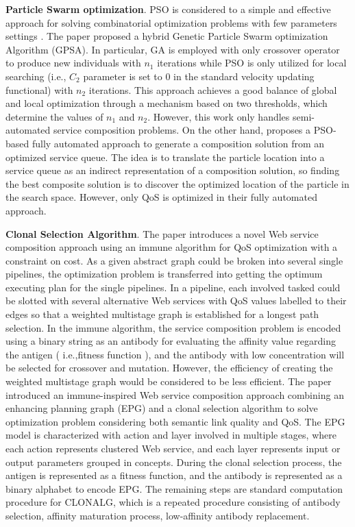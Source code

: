 \textbf{Particle Swarm optimization}.
PSO is considered to a simple and effective approach for solving combinatorial optimization problems with few parameters settings \cite{long2009environment}. The paper \cite{liu2007hybrid} proposed a hybrid Genetic Particle Swarm optimization Algorithm (GPSA). In particular, GA is employed with only crossover operator to produce new individuals with $n_1$ iterations while PSO is only utilized for local searching (i.e., $C_2$ parameter is set to 0 in the standard velocity updating functional) with $n_2$ iterations. This approach achieves a good balance of global and local optimization through a  mechanism based on two thresholds, which determine the values of $n_1$ and $n_2$. However, this work \cite{liu2007hybrid} only handles semi-automated service composition problems. On the other hand, \cite{da2016particle} proposes a PSO-based fully automated approach to generate a composition solution from an optimized service queue. The idea is to translate the particle location into a service queue as an indirect representation of a composition solution, so finding the best composite solution is to discover the optimized location of the particle in the search space. However, only QoS is optimized in their fully automated approach.

\textbf{Clonal Selection Algorithm}.
The paper \cite{yan2006immune} introduces a novel Web service composition approach using an immune algorithm for QoS optimization with a constraint on cost. As a given abstract graph could be broken into several single pipelines, the optimization problem is transferred into getting the optimum executing plan for the single pipelines. In a pipeline, each involved tasked could be slotted with several alternative Web services with QoS values labelled to their edges so that a weighted multistage graph is established for a longest path selection. In the immune algorithm, the service composition problem is encoded using a binary string as an antibody for evaluating the affinity value regarding the antigen ( i.e.,fitness function ), and the antibody with low concentration will be selected for crossover and mutation. However, the efficiency of creating the weighted multistage graph would be considered to be less efficient. The paper \cite{pop2009immune} introduced an immune-inspired Web service composition approach combining an enhancing planning graph (EPG) and a clonal selection algorithm to solve optimization problem considering both semantic link quality and QoS.  The EPG model is characterized with action and layer involved in multiple stages, where each action represents clustered Web service, and each layer represents input or output parameters grouped in concepts. During the clonal selection process, the antigen is represented as a fitness function, and the antibody is represented as a binary alphabet to encode EPG. The remaining steps are standard computation procedure for CLONALG, which is a repeated procedure consisting of antibody selection, affinity maturation process, low-affinity antibody replacement.

